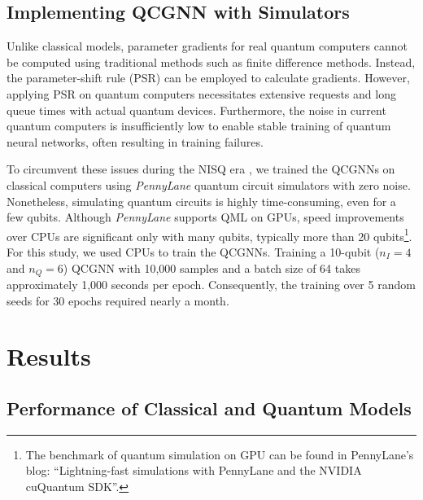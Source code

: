 \documentclass[reprint,amsmath,amssymb,prd,nofootinbib]{revtex4-2}
\newcommand{\PennyLane}{\textit{PennyLane}\xspace}
\begin{document}
\subsection{Implementing QCGNN with Simulators} \label{sec_train_QCGNN}

Unlike classical models, parameter gradients for real quantum computers cannot be computed using traditional methods such as finite difference methods. Instead, the parameter-shift rule (PSR) \cite{psr1,psr2,psr3,psr4} can be employed to calculate gradients. However, applying PSR on quantum computers necessitates extensive requests and long queue times with actual quantum devices. Furthermore, the noise in current quantum computers is insufficiently low to enable stable training of quantum neural networks, often resulting in training failures.

To circumvent these issues during the NISQ era \cite{nisq}, we trained the QCGNNs on classical computers using \PennyLane \cite{pennylane} quantum circuit simulators with zero noise. Nonetheless, simulating quantum circuits is highly time-consuming, even for a few qubits. Although \PennyLane supports QML on GPUs, speed improvements over CPUs are significant only with many qubits, typically more than 20 qubits\footnote{The benchmark of quantum simulation on GPU can be found in PennyLane's blog: ``Lightning-fast simulations with PennyLane and the NVIDIA cuQuantum SDK''.}. For this study, we used CPUs to train the QCGNNs. Training a 10-qubit ($n_I=4$ and $n_Q=6$) QCGNN with 10,000 samples and a batch size of 64 takes approximately 1,000 seconds per epoch. Consequently, the training over 5 random seeds for 30 epochs required nearly a month.

\section{Results} \label{sec_result}

\subsection{Performance of Classical and Quantum Models} \label{sec_performance}
\end{document}
